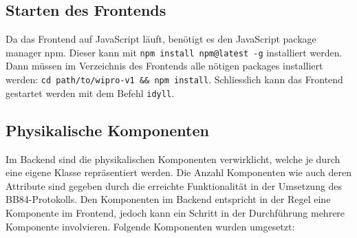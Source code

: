 \documentclass[a4paper,10.2pt,pdftex]{scrartcl}%
\begin{document}
\subsection{Starten des Frontends}
Da das Frontend auf JavaScript läuft, benötigt es den JavaScript package manager npm. Dieser kann mit \texttt{npm install npm@latest -g} installiert werden. Dann müssen im Verzeichnis des Frontends alle nötigen packages installiert werden: \texttt{cd path/to/wipro-v1 \&\& npm install}. Schliesslich kann das Frontend gestartet werden mit dem Befehl \texttt{idyll}.

\subsection{Physikalische Komponenten}
Im Backend sind die physikalischen Komponenten verwirklicht, welche je durch eine eigene Klasse repräsentiert werden. Die Anzahl Komponenten wie auch deren Attribute sind gegeben durch die erreichte Funktionalität in der Umsetzung des BB84-Protokolls. Den Komponenten im Backend entspricht in der Regel eine Komponente im Frontend, jedoch kann ein Schritt in der Durchführung mehrere Komponente involvieren. Folgende Komponenten wurden umgesetzt:
\end{document}
